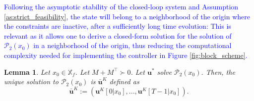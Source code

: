 \documentclass[letterpaper, 10 pt, conference]{ieeeconf}  %
\newcommand{\edit}[1]{\textcolor{blue}{#1}}
\newcommand{\mc}{\mathcal}
\newcommand{\bu}{\boldsymbol{u}}
\newtheorem{lemma}{Lemma}
\begin{document}
 \edit{Following the asymptotic stability of the closed-loop system \cite[Theorem 2]{benenati2024linear} and Assumption \ref{as:strict_feasibility}, the state will belong to a neighborhood of the origin where the constraints are inactive, after a sufficiently long time evolution: This is relevant as it allows one to derive a closed-form solution for the solution of $\mc P_2(x_0)$ in a neighborhood of the origin, thus reducing the computational complexity needed for implementing the controller in Figure \ref{fig:block_scheme}.}
\begin{lemma}\label{lem: inactive cons}
    Let $x_0\in \mathbb{X}_f$. Let $M+M^{\top}\succ 0$. Let $\bu^*$ solve $\mc P_2(x_0)$. Then, the unique solution to $\mc P_2(x_0)$ is  $\bar{\bu}^K$ defined as
    \begin{equation}
    \label{eq:def_bar_u_K}
    \bar{\bu}^K:=(\bu^K[0|x_0], ..., \bu^K[T-1|x_0]).
    \end{equation} 
\end{lemma}
\end{document}
